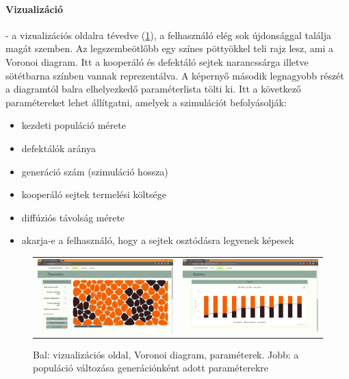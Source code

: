\paragraph{Vizualizáció}- a vizualizációs oldalra tévedve (\ref{fig:VisualizationDiagram}), a felhasználó elég sok újdonsággal találja magát szemben. Az legszembeötlőbb egy színes pöttyökkel teli rajz lesz, ami a Voronoi diagram. Itt a kooperáló és defektáló sejtek narancssárga illetve sötétbarna színben vannak reprezentálva. A képernyő második legnagyobb részét a diagramtól balra elhelyezkedő paraméterlista tölti ki. Itt a következő paramétereket lehet állítgatni, amelyek a szimulációt befolyásolják:
\begin{itemize}
	\item kezdeti populáció mérete
	\item defektálók aránya 
	\item generáció szám (szimuláció hossza)
	\item kooperáló sejtek termelési költsége 
	\item diffúziós távolság mérete
	\item akarja-e a felhasználó, hogy a sejtek osztódásra legyenek képesek
\end{itemize}

\begin{figure}[ht!]
	\centering
	\captionsetup{justification=centering}
	\begin{tabular}{cc}
		\includegraphics[width=0.47\linewidth]{images/EGTIB}
		&
		\includegraphics[width=0.47\linewidth]{images/VisualizationDiagram}
	\end{tabular}
	\caption{Bal: vizualizációs oldal, Voronoi diagram, paraméterek. Jobb: a populáció változása generációnként adott paraméterekre}	
	\label{fig:VisualizationDiagram}
\end{figure}


